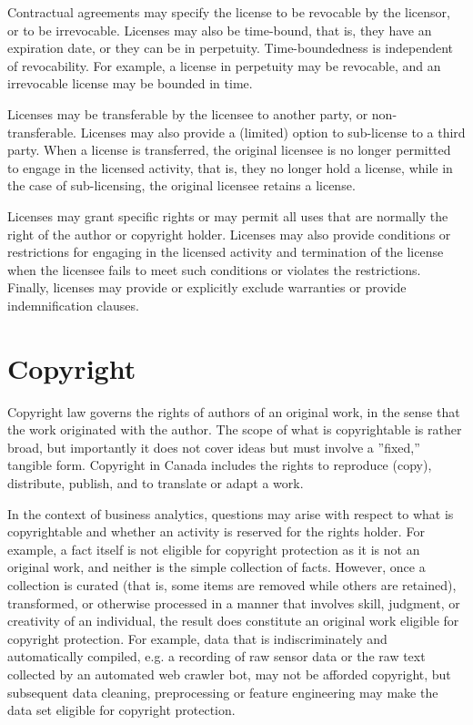 Contractual agreements may specify the license to be revocable by the licensor, or to be irrevocable. Licenses may also be time-bound, that is, they have an expiration date, or they can be in perpetuity. Time-boundedness is independent of revocability. For example, a license in perpetuity may be revocable, and an irrevocable license may be bounded in time. 

Licenses may be transferable by the licensee to another party, or non-transferable. Licenses may also provide a (limited) option to sub-license to a third party. When a license is transferred, the original licensee is no longer permitted to engage in the licensed activity, that is, they no longer hold a license, while in the case of sub-licensing, the original licensee retains a license. 

Licenses may grant specific rights or may permit all uses that are normally the right of the author or copyright holder. Licenses may also provide conditions or restrictions for engaging in the licensed activity and termination of the license when the licensee fails to meet such conditions or violates the restrictions. Finally, licenses may provide or explicitly exclude warranties or provide indemnification clauses. 

\section{Copyright}

Copyright law governs the rights of authors of an original work, in the sense that the work originated with the author. The scope of what is copyrightable is rather broad, but importantly it does not cover ideas but must involve a ''fixed,'' tangible form. Copyright in Canada includes the rights to reproduce (copy), distribute, publish, and to translate or adapt a work. 

In the context of business analytics, questions may arise with respect to what is copyrightable and whether an activity is reserved for the rights holder. For example, a fact itself is not eligible for copyright protection as it is not an original work, and neither is the simple collection of facts. However, once a collection is curated (that is, some items are removed while others are retained), transformed, or otherwise processed in a manner that involves skill, judgment, or creativity of an individual, the result does constitute an original work eligible for copyright protection. For example, data that is indiscriminately and automatically compiled, e.g. a recording of raw sensor data or the raw text collected by an automated web crawler bot, may not be afforded copyright, but subsequent data cleaning, preprocessing or feature engineering may make the data set eligible for copyright protection.

